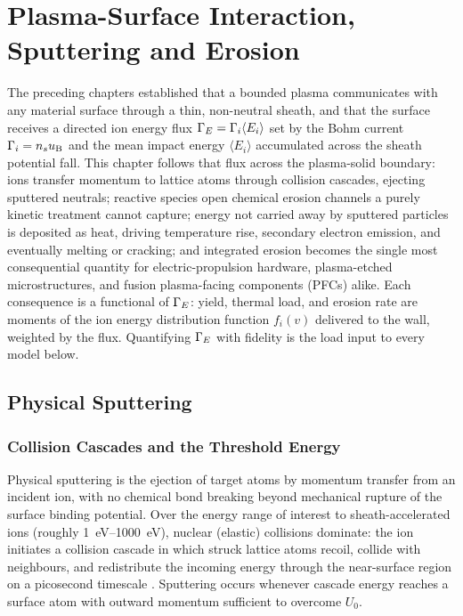 \chapter{Plasma-Surface Interaction, Sputtering and Erosion}
\label{ch:pmi}

The preceding chapters established that a bounded plasma communicates with any material surface through a thin, non-neutral sheath, and that the surface receives a directed ion energy flux $\Gamma_{E} = \Gamma_i \langle E_i\rangle$ set by the Bohm current $\Gamma_i = n_s u_{\mathrm{B}}$ and the mean impact energy $\langle E_i\rangle$ accumulated across the sheath potential fall. This chapter follows that flux across the plasma-solid boundary: ions transfer momentum to lattice atoms through collision cascades, ejecting sputtered neutrals; reactive species open chemical erosion channels a purely kinetic treatment cannot capture; energy not carried away by sputtered particles is deposited as heat, driving temperature rise, secondary electron emission, and eventually melting or cracking; and integrated erosion becomes the single most consequential quantity for electric-propulsion hardware, plasma-etched microstructures, and fusion plasma-facing components (PFCs) alike. Each consequence is a functional of $\Gamma_{E}$: yield, thermal load, and erosion rate are moments of the ion energy distribution function $f_i(v)$ delivered to the wall, weighted by the flux. Quantifying $\Gamma_{E}$ with fidelity is the load input to every model below.

\section{Physical Sputtering}
\label{sec:pmi-physical-sputtering}

\subsection{Collision Cascades and the Threshold Energy}

Physical sputtering is the ejection of target atoms by momentum transfer from an incident ion, with no chemical bond breaking beyond mechanical rupture of the surface binding potential. Over the energy range of interest to sheath-accelerated ions (roughly \SIrange{1}{1000}{\electronvolt}), nuclear (elastic) collisions dominate: the ion initiates a collision cascade in which struck lattice atoms recoil, collide with neighbours, and redistribute the incoming energy through the near-surface region on a picosecond timescale \cite{ref0143,ref0144}. Sputtering occurs whenever cascade energy reaches a surface atom with outward momentum sufficient to overcome $U_0$.

